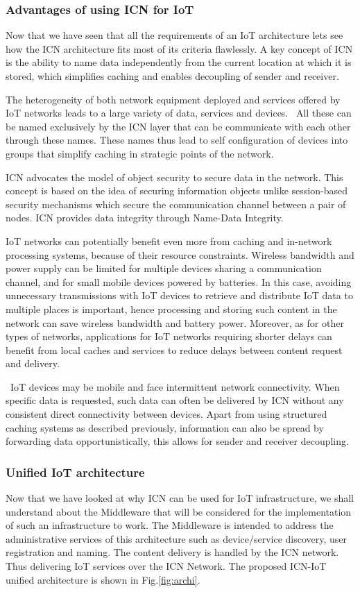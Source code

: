 \subsubsection{Advantages of using ICN for IoT}
Now that we have seen that all the requirements of an IoT architecture lets see how the ICN architecture fits most of its criteria flawlessly. A key concept of ICN is the ability to name data independently from the current location at which it is stored, which simplifies caching and enables decoupling of sender and receiver. \par
The heterogeneity of both network equipment deployed and services offered by IoT networks leads to a large variety of data, services and devices.  All these can be named exclusively by the ICN layer that can be communicate with each other through these names. These names thus lead to self configuration of devices into groups that simplify caching in strategic points of the network.\par
ICN advocates the model of object security to secure data in the network. This concept is based on the idea of securing information objects unlike session-based security mechanisms which secure the communication channel between a pair of nodes. ICN provides data integrity through Name-Data Integrity.\par
IoT networks can potentially benefit even more from caching and in-network processing systems, because of their resource constraints. Wireless bandwidth and power supply can be limited for multiple devices sharing a communication channel, and for small mobile devices powered by batteries. In this case, avoiding unnecessary transmissions with IoT devices to retrieve and distribute IoT data to multiple places is important, hence processing and storing such content in the network can save wireless bandwidth and battery power. Moreover, as for other types of networks, applications for IoT networks requiring shorter delays can benefit from local caches and services to reduce delays between content request and delivery. \par
 IoT devices may be mobile and face intermittent network connectivity. When specific data is requested, such data can often be delivered by ICN without any consistent direct connectivity between devices. Apart from using structured caching systems as described previously, information can also be spread by forwarding data opportunistically, this allows for sender and receiver decoupling.
\subsubsection{Unified IoT architecture}
Now that we have looked at why ICN can be used for IoT infrastructure, we shall understand about the Middleware that will be considered for the implementation of such an infrastructure to work.
The Middleware is intended to address the administrative services of this architecture such as device/service discovery, user registration and naming. The content delivery is handled by the ICN network. Thus delivering IoT services over the ICN Network.
The proposed ICN-IoT unified architecture is shown in Fig.\ref{fig:archi}.
\par

